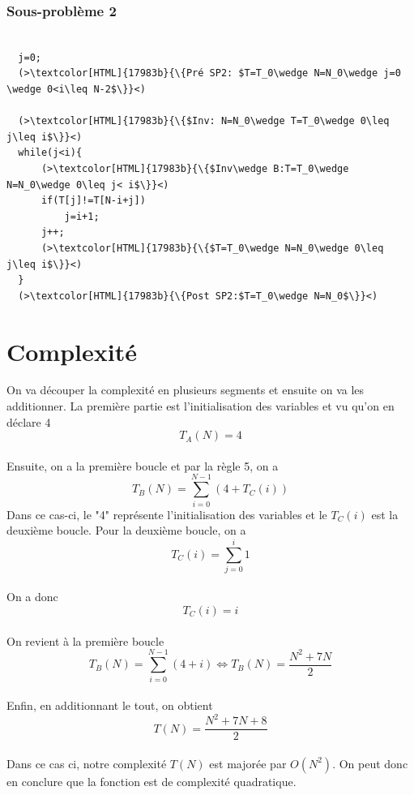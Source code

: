 \documentclass[a4paper, 11pt, oneside]{article}
\begin{document}
\subsubsection{Sous-problème 2}
\begin{lstlisting}[caption={Sous-problème 2}]
  
  j=0;
  (>\textcolor[HTML]{17983b}{\{Pré SP2: $T=T_0\wedge N=N_0\wedge j=0 \wedge 0<i\leq N-2$\}}<)
  
  (>\textcolor[HTML]{17983b}{\{$Inv: N=N_0\wedge T=T_0\wedge 0\leq j\leq i$\}}<)
  while(j<i){
      (>\textcolor[HTML]{17983b}{\{$Inv\wedge B:T=T_0\wedge N=N_0\wedge 0\leq j< i$\}}<)      
      if(T[j]!=T[N-i+j])
          j=i+1;
      j++;
      (>\textcolor[HTML]{17983b}{\{$T=T_0\wedge N=N_0\wedge 0\leq j\leq i$\}}<)
  }
  (>\textcolor[HTML]{17983b}{\{Post SP2:$T=T_0\wedge N=N_0$\}}<)
\end{lstlisting}


\section{Complexité}
On va découper la complexité en plusieurs segments et ensuite on va les additionner.
La première partie est l'initialisation des variables et vu qu'on en déclare 4 $$T_A(N)=4$$\\
Ensuite, on a la première boucle et par la règle 5, on a $$T_B(N)=\sum_{i=0}^{N-1}(4+T_C(i))$$ Dans ce cas-ci, le "4" représente l'initialisation des variables et le $T_C(i)$ est la deuxième boucle.
Pour la deuxième boucle, on a $$T_C(i)=\sum_{j=0}^i1$$\\
On a donc $$T_C(i)=i$$\\
On revient à la première boucle $$T_B(N)=\sum_{i=0}^{N-1}(4+i)\Leftrightarrow T_B(N)=\frac{N^2+7N}{2}$$\\
Enfin, en additionnant le tout, on obtient $$T(N)=\frac{N^2+7N+8}{2}$$\\
Dans ce cas ci, notre complexité $T(N)$ est majorée par $O(N^2)$. On peut donc en conclure que la fonction est de complexité quadratique.
\end{document}
